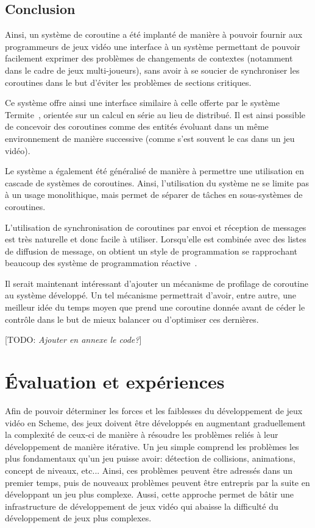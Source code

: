 \documentclass[12pt,oneside,letterpaper,francais]{book}
\newcommand{\todo}[1]{[TODO: {\it #1}]}
\begin{document}
\section{Conclusion}

Ainsi, un système de coroutine a été implanté de manière à pouvoir
fournir aux programmeurs de jeux vidéo une interface à un système
permettant de pouvoir facilement exprimer des problèmes de changements
de contextes (notamment dans le cadre de jeux multi-joueurs), sans
avoir à se soucier de synchroniser les coroutines dans le but d'éviter
les problèmes de sections critiques.

Ce système offre ainsi une interface similaire à celle offerte par le
système Termite~\cite{Termite_paper}, orientée sur un calcul en série
au lieu de distribué. Il est ainsi possible de concevoir des
coroutines comme des entités évoluant dans un même environnement de
manière successive (comme s'est souvent le cas dans un jeu vidéo).

Le système a également été généralisé de manière à permettre une
utilisation en cascade de systèmes de coroutines. Ainsi, l'utilisation
du système ne se limite pas à un usage monolithique, mais permet de
séparer de tâches en sous-systèmes de coroutines.

L'utilisation de synchronisation de coroutines par envoi et réception
de messages est très naturelle et donc facile à utiliser. Lorsqu'elle
est combinée avec des listes de diffusion de message, on obtient un
style de programmation se rapprochant beaucoup des système de
programmation réactive~\cite{FRP}.

Il serait maintenant intéressant d'ajouter un mécanisme de profilage
de coroutine au système développé. Un tel mécanisme permettrait
d'avoir, entre autre, une meilleur idée du temps moyen que prend une
coroutine donnée avant de céder le contrôle dans le but de mieux
balancer ou d'optimiser ces dernières.

\todo{Ajouter en annexe le code?}


\chapter{Évaluation et expériences}

Afin de pouvoir déterminer les forces et les faiblesses du
développement de jeux vidéo en Scheme, des jeux doivent être
développés en augmentant graduellement la complexité de ceux-ci de
manière à résoudre les problèmes reliés à leur développement de
manière itérative. Un jeu simple comprend les problèmes les plus
fondamentaux qu'un jeu puisse avoir: détection de collisions,
animations, concept de niveaux, etc... Ainsi, ces problèmes peuvent
être adressés dans un premier temps, puis de nouveaux problèmes
peuvent être entrepris par la suite en développant un jeu plus
complexe. Aussi, cette approche permet de bâtir une infrastructure de
développement de jeux vidéo qui abaisse la difficulté du développement
de jeux plus complexes.
\end{document}
